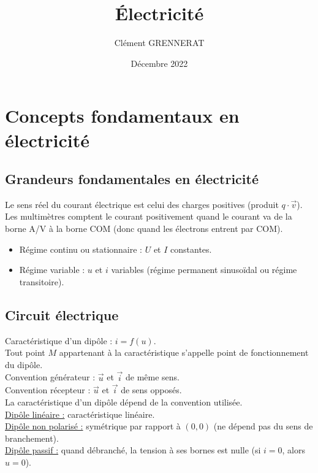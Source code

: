 \documentclass[13pt, twoside, a4paper, french]{report}
\newcommand*{\getSubject}{Électricité}
\begin{document}
    \title{\getSubject}
    \author{Clément GRENNERAT}
    \date{Décembre 2022}
    \pagestyle{non-chapter-style}


    \chapter{Concepts fondamentaux en électricité}\label{ch:concepts-fondamentaux-en-electricite}


    \section{Grandeurs fondamentales en électricité}\label{sec:grandeurs-fondamentales-en-electricite}

    Le sens réel du courant électrique est celui des charges positives (produit $q \cdot \vec v$).\\

    Les multimètres comptent le courant positivement quand le courant va de la borne A/V à la borne COM (donc quand les électrons entrent par COM).\\

    \begin{itemize}
        \item Régime continu ou stationnaire : $U$ et $I$ constantes.
        \item Régime variable : $u$ et $i$ variables (régime permanent sinusoïdal ou régime transitoire).
    \end{itemize}


    \section{Circuit électrique}\label{sec:circuit-electrique}

    Caractéristique d'un dipôle : $i = f(u)$.\\
    Tout point $M$ appartenant à la caractéristique s'appelle point de fonctionnement du dipôle.\\

    Convention générateur : $\vec u$ et $\vec i$ de même sens.\\
    Convention récepteur : $\vec u$ et $\vec i$ de sens opposés.\\
    La caractéristique d'un dipôle dépend de la convention utilisée.\\

    \underline{Dipôle linéaire :} caractéristique linéaire.\\
    \underline{Dipôle non polarisé :} symétrique par rapport à $(0, 0)$ (ne dépend pas du sens de branchement).\\
    \underline{Dipôle passif :} quand débranché, la tension à ses bornes est nulle (si $i = 0$, alors $u = 0$).\\
\end{document}
